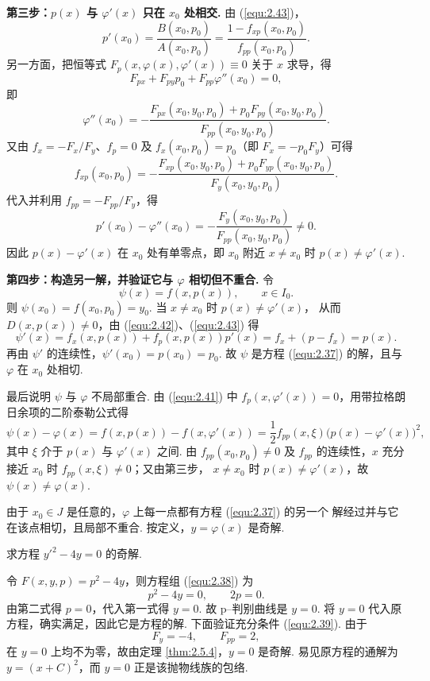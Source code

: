 \begin{pf1}
\textbf{第三步：$p(x)$ 与 $\varphi'(x)$ 只在 $x_0$ 处相交.} 由 (\ref{equ:2.43})，
\[
p'(x_0)=\frac{B(x_0,p_0)}{A(x_0,p_0)}
=\frac{1-f_{xp}(x_0,p_0)}{f_{pp}(x_0,p_0)}.
\]
另一方面，把恒等式 $F_p(x,\varphi(x),\varphi'(x))\equiv0$ 关于 $x$ 求导，得
\[
F_{px}+F_{py}p_0+F_{pp}\varphi''(x_0)=0,
\]
即
\[
\varphi''(x_0)
=-\frac{F_{px}(x_0,y_0,p_0)+p_0F_{py}(x_0,y_0,p_0)}
{F_{pp}(x_0,y_0,p_0)}.
\]
又由 $f_x=-F_x/F_y$、$f_p=0$ 及 $f_x(x_0,p_0)=p_0$（即 $F_x=-p_0F_y$）可得
\[
f_{xp}(x_0,p_0)
=-\frac{F_{xp}(x_0,y_0,p_0)+p_0F_{yp}(x_0,y_0,p_0)}{F_y(x_0,y_0,p_0)}.
\]
代入并利用 $f_{pp}=-F_{pp}/F_y$，得
\[
p'(x_0)-\varphi''(x_0)
=-\frac{F_y(x_0,y_0,p_0)}{F_{pp}(x_0,y_0,p_0)}\neq0.
\]
因此 $p(x)-\varphi'(x)$ 在 $x_0$ 处有单零点，即 $x_0$ 附近 $x\neq x_0$ 时
$p(x)\neq\varphi'(x)$.

\textbf{第四步：构造另一解，并验证它与 $\varphi$ 相切但不重合.} 令
\[
\psi(x)=f(x,p(x)),\qquad x\in I_0.
\]
则 $\psi(x_0)=f(x_0,p_0)=y_0$. 当 $x\neq x_0$ 时 $p(x)\neq\varphi'(x)$，
从而 $D(x,p(x))\neq0$，由 (\ref{equ:2.42})、(\ref{equ:2.43}) 得
\[
\psi'(x)=f_x(x,p(x))+f_p(x,p(x))p'(x)=f_x+(p-f_x)=p(x).
\]
再由 $\psi'$ 的连续性，$\psi'(x_0)=p(x_0)=p_0$. 故 $\psi$ 是方程
(\ref{equ:2.37}) 的解，且与 $\varphi$ 在 $x_0$ 处相切.

最后说明 $\psi$ 与 $\varphi$ 不局部重合. 由 (\ref{equ:2.41}) 中
$f_p(x,\varphi'(x))=0$，用带拉格朗日余项的二阶泰勒公式得
\[
\psi(x)-\varphi(x)=f(x,p(x))-f(x,\varphi'(x))
=\frac12 f_{pp}(x,\xi)\bigl(p(x)-\varphi'(x)\bigr)^2,
\]
其中 $\xi$ 介于 $p(x)$ 与 $\varphi'(x)$ 之间. 由 $f_{pp}(x_0,p_0)\neq0$ 及
$f_{pp}$ 的连续性，$x$ 充分接近 $x_0$ 时 $f_{pp}(x,\xi)\neq0$；又由第三步，
$x\neq x_0$ 时 $p(x)\neq\varphi'(x)$，故 $\psi(x)\neq\varphi(x)$.

由于 $x_0\in J$ 是任意的，$\varphi$ 上每一点都有方程 (\ref{equ:2.37}) 的另一个
解经过并与它在该点相切，且局部不重合. 按定义，$y=\varphi(x)$ 是奇解.
\end{pf1}


\begin{eg}
求方程 $y'^2-4y=0$ 的奇解.
\begin{pf2}
令 $F(x,y,p)=p^2-4y$，则方程组 (\ref{equ:2.38}) 为
\[
p^2-4y=0,\qquad 2p=0.
\]
由第二式得 $p=0$，代入第一式得 $y=0$. 故 p--判别曲线是 $y=0$.
将 $y=0$ 代入原方程，确实满足，因此它是方程的解. 下面验证充分条件
(\ref{equ:2.39}). 由于
\[
F_y=-4,\qquad F_{pp}=2,
\]
在 $y=0$ 上均不为零，故由定理 \ref{thm:2.5.4}，$y=0$ 是奇解.
易见原方程的通解为 $y=(x+C)^2$，而 $y=0$ 正是该抛物线族的包络.
\end{pf2}
\end{eg}


